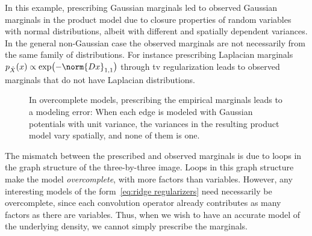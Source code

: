 In this example, prescribing Gaussian marginals led to observed Gaussian marginals in the product model due to closure properties of random variables with normal distributions, albeit with different and spatially dependent variances.
In the general non-Gaussian case the observed marginals are not necessarily from the same family of distributions.
For instance prescribing Laplacian marginals \( p_{\hat{X}}(x) \propto \exp\bigl( -\norm{\DiffOp x}_{\num{1},\num{1}} \bigr) \) through \gls{tv} regularization leads to observed marginals that do not have Laplacian distributions.
\begin{figure}
	\caption[%
		In overcomplete models, prescribing the empirical marginals leads to a modeling error%
	]{%
		In overcomplete models, prescribing the empirical marginals leads to a modeling error:
		When each edge is modeled with Gaussian potentials with unit variance, the variances in the resulting product model vary spatially, and none of them is one.
	}%
	\label{fig:variances with prescribed marginals}
\end{figure}

The mismatch between the prescribed and observed marginals is due to loops in the graph structure of the three-by-three image.
Loops in this graph structure make the model \emph{overcomplete}, with more factors than variables.
However, any interesting models of the form~\cref{eq:ridge regularizers} need necessarily be overcomplete, since each convolution operator already contributes as many factors as there are variables.
Thus, when we wish to have an accurate model of the underlying density, we cannot simply prescribe the marginals.


